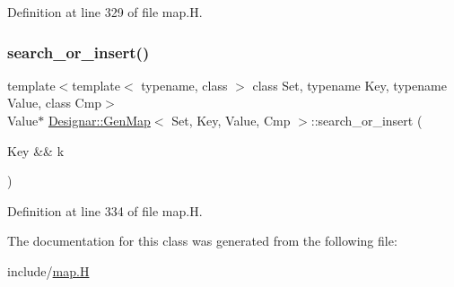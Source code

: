 Definition at line 329 of file map.\+H.

\mbox{\label{class_designar_1_1_gen_map_ae2ab69b26f782abcd99f99944253d8de}} 
\subsubsection{\texorpdfstring{search\+\_\+or\+\_\+insert()}{search\_or\_insert()}\hspace{0.1cm}{\footnotesize\ttfamily [6/6]}}
{\footnotesize\ttfamily template$<$template$<$ typename, class $>$ class Set, typename Key, typename Value, class Cmp$>$ \\
Value$\ast$ \hyperlink{class_designar_1_1_gen_map}{Designar\+::\+Gen\+Map}$<$ Set, Key, Value, Cmp $>$\+::search\+\_\+or\+\_\+insert (\begin{DoxyParamCaption}\item[{Key \&\&}]{k }\end{DoxyParamCaption})\hspace{0.3cm}{\ttfamily [inline]}}



Definition at line 334 of file map.\+H.



The documentation for this class was generated from the following file\+:\begin{DoxyCompactItemize}
\item 
include/\hyperlink{map_8_h}{map.\+H}\end{DoxyCompactItemize}
